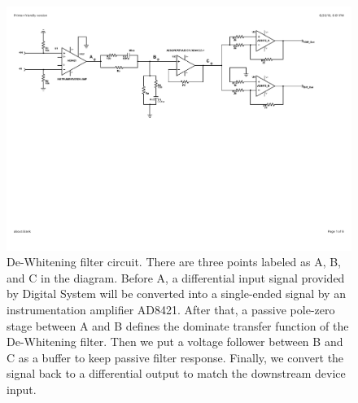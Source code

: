 \begin{figure}
\includegraphics[width=1\textwidth]{figure/DEWcircuit.pdf}
\caption[De-Whitening filter circuit]{De-Whitening filter circuit. There are three points labeled as A, B, and C in the diagram. Before A, a differential input signal provided by Digital System will be converted into a single-ended signal by an instrumentation amplifier AD8421. After that, a passive pole-zero stage between A and B defines the dominate transfer function of the De-Whitening filter. Then we put a voltage follower between B and C as a buffer to keep passive filter response. Finally, we convert the signal back to a differential output to match the downstream device input. }\label{fig:dewcircuit}
\end{figure}


